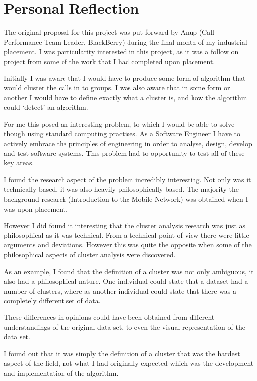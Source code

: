 \section{Personal Reflection}
\label{sec:personal_reflection}

The original proposal for this project was put forward by Anup (Call 
Performance Team Leader, BlackBerry) during the final month of my industrial 
placement. I was particularity interested in this project, as it was a follow 
on project from some of the work that I had completed upon placement.

Initially I was aware that I would have to produce some form of algorithm that
would cluster the calls in to groups. I was also aware that in some form or 
another I would have to define exactly what a cluster is, and how the algorithm 
could `detect' an algorithm.

For me this posed an interesting problem, to which I would be able to solve 
though using standard computing practises. As a Software Engineer I have to 
actively embrace the principles of engineering in order to analyse, design, 
develop and test software systems. This problem had to opportunity to test all 
of these key areas.

I found the research aspect of the problem incredibly interesting. Not only was
it technically based, it was also heavily philosophically based. The majority 
the background research (Introduction to the Mobile Network) was obtained when
I was upon placement. 

However I did found it interesting that the cluster analysis research was just 
as philosophical as it was technical. From a technical point of view there were
little arguments and deviations. However this was quite the opposite when some 
of the philosophical aspects of cluster analysis were discovered.

As an example, I found that the definition of a cluster was not only ambiguous,
it also had a philosophical nature. One individual could state that a dataset 
had a number of clusters, where as another individual could state that there 
was a completely different set of data.

These differences in opinions could have been obtained from different 
understandings of the original data set, to even the visual representation of 
the data set. 

I found out that it was simply the definition of a cluster that was the hardest
aspect of the field, not what I had originally expected which was the 
development and implementation of the algorithm.

